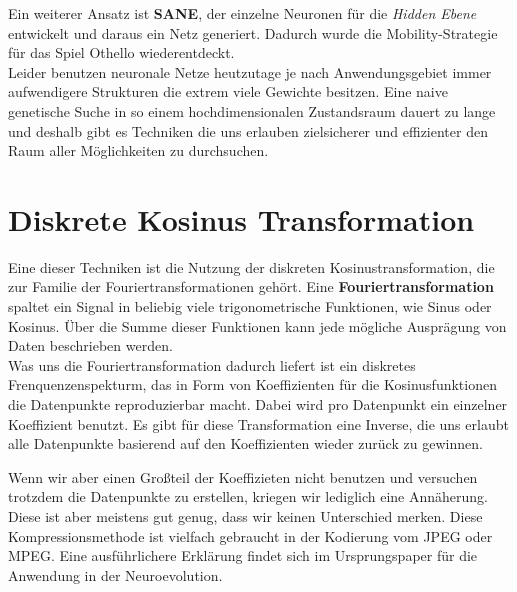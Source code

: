             \noindent
            Ein weiterer Ansatz ist \textbf{SANE}\cite{moriarty1999evolutionary}, der einzelne Neuronen für die \textit{Hidden Ebene} entwickelt und daraus ein Netz generiert. Dadurch wurde die Mobility-Strategie für das Spiel Othello wiederentdeckt. \\

            \noindent
            Leider benutzen neuronale Netze heutzutage je nach Anwendungsgebiet immer aufwendigere Strukturen die extrem viele Gewichte besitzen. Eine naive genetische Suche in so einem hochdimensionalen Zustandsraum dauert zu lange und deshalb gibt es Techniken die uns erlauben zielsicherer und effizienter den Raum aller Möglichkeiten zu durchsuchen.


    \section{Diskrete Kosinus Transformation}

        Eine dieser Techniken ist die Nutzung der diskreten Kosinustransformation, die zur Familie der Fouriertransformationen gehört. Eine \textbf{Fouriertransformation} spaltet ein Signal in beliebig viele trigonometrische Funktionen, wie Sinus oder Kosinus. Über die Summe dieser Funktionen kann jede mögliche Ausprägung von Daten beschrieben werden. \\

        \noindent
        Was uns die Fouriertransformation dadurch liefert ist ein diskretes Frenquenzenspekturm, das in Form von Koeffizienten für die Kosinusfunktionen die Datenpunkte reproduzierbar macht. Dabei wird pro Datenpunkt ein einzelner Koeffizient benutzt. Es gibt für diese Transformation eine Inverse, die uns erlaubt alle Datenpunkte basierend auf den Koeffizienten wieder zurück zu gewinnen. 

        \noindent
        Wenn wir aber einen Großteil der Koeffizieten nicht benutzen und versuchen trotzdem die Datenpunkte zu erstellen, kriegen wir lediglich eine Annäherung. Diese ist aber meistens gut genug, dass wir keinen Unterschied merken. Diese Kompressionsmethode ist vielfach gebraucht in der Kodierung vom JPEG oder MPEG. Eine ausführlichere Erklärung findet sich im Ursprungspaper für die Anwendung in der Neuroevolution\cite{cosyne1}.


